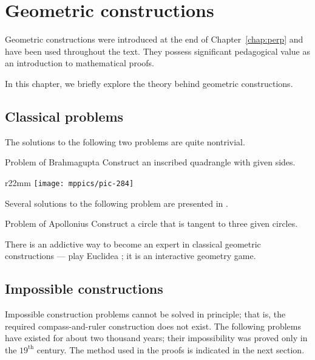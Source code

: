 \chapter{Geometric constructions}
\label{chap:car}

Geometric constructions were introduced at the end of Chapter~\ref{chap:perp} and have been used throughout the text. They possess significant pedagogical value as an introduction to mathematical proofs.

In this chapter, we briefly explore the theory behind geometric constructions.


%
%

\section{Classical problems}

The solutions to the following two problems are quite nontrivial.

\begin{thm}{Problem of Brahmagupta} 
Construct an inscribed quadrangle with given sides.
\end{thm}

{

\begin{wrapfigure}[7]{r}{22mm}
\vskip-6mm
\centering
\texttt{[image: mppics/pic-284]}
\end{wrapfigure}

Several solutions to the following problem are presented in \cite{hadamard}.
 
\begin{thm}{Problem of Apollonius} Construct a circle that is tangent to three given circles.
\end{thm}

There is an addictive way to become an expert in classical geometric constructions ---
play Euclidea \cite{euclidea}; it is an interactive geometry game.

}

\section{Impossible constructions}

Impossible construction problems cannot be solved in principle; 
that is, the required compass-and-ruler construction does not exist.
The following problems have existed for about two thousand years;
their impossibility was proved only in the $19^\text{th}$ century.
The method used in the proofs is indicated in the next section.


